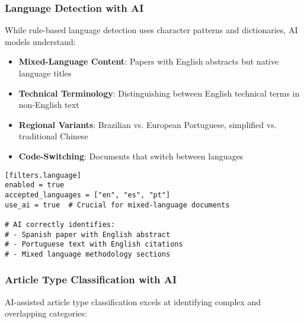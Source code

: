 
\subsubsection{Language Detection with AI}

While rule-based language detection uses character patterns and dictionaries, AI models understand:

\begin{itemize}
    \item \textbf{Mixed-Language Content}: Papers with English abstracts but native language titles
    \item \textbf{Technical Terminology}: Distinguishing between English technical terms in non-English text
    \item \textbf{Regional Variants}: Brazilian vs. European Portuguese, simplified vs. traditional Chinese
    \item \textbf{Code-Switching}: Documents that switch between languages
\end{itemize}

\begin{configbox}
\begin{lstlisting}
[filters.language]
enabled = true
accepted_languages = ["en", "es", "pt"]
use_ai = true  # Crucial for mixed-language documents

# AI correctly identifies:
# - Spanish paper with English abstract
# - Portuguese text with English citations
# - Mixed language methodology sections
\end{lstlisting}
\end{configbox}

\subsubsection{Article Type Classification with AI}

AI-assisted article type classification excels at identifying complex and overlapping categories:


